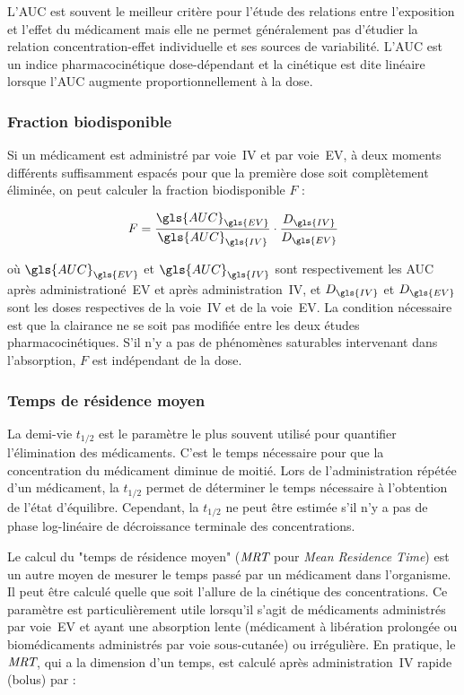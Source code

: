 L'\gls{AUC} est souvent le meilleur critère pour l'étude des relations entre l'exposition et l'effet du médicament mais elle ne permet généralement pas d'étudier la relation concentration-effet individuelle et ses sources de variabilité. L'\gls{AUC} est un indice pharmacocinétique dose-dépendant et la cinétique est dite linéaire lorsque l'\gls{AUC} augmente proportionnellement à la dose.

\subsubsection{Fraction biodisponible}
Si un médicament est administré par voie~\gls{IV} et par voie~\gls{EV}, à deux moments différents suffisamment espacés pour que la première dose soit complètement éliminée, on peut calculer la fraction biodisponible $F$ :

\begin{equation}
F = \frac{\gls{AUC}_{\gls{EV}}}{\gls{AUC}_{\gls{IV}}} \cdot \frac{D_{\gls{IV}}}{D_{\gls{EV}}}
\label{eq:5}
\end{equation}

où $\gls{AUC}_{\gls{EV}}$ et $\gls{AUC}_{\gls{IV}}$ sont respectivement les \gls{AUC} après administrationé~\gls{EV} et après administration~\gls{IV}, et $D_{\gls{IV}}$ et $D_{\gls{EV}}$ sont les doses respectives de la voie~\gls{IV} et de la voie~\gls{EV}. La condition nécessaire est que la clairance ne se soit pas modifiée entre les deux études pharmacocinétiques. S'il n'y a pas de phénomènes saturables intervenant dans l'absorption, $F$ est indépendant de la dose.

\subsubsection{Temps de résidence moyen} 
La demi-vie $t_{1/2}$ est le paramètre le plus souvent utilisé pour quantifier l'élimination des médicaments. C'est le temps nécessaire pour que la concentration du médicament diminue de moitié. Lors de l'administration répétée d'un médicament, la $t_{1/2}$ permet de déterminer le temps nécessaire à l'obtention de l'état d'équilibre. Cependant, la $t_{1/2}$ ne peut être estimée s'il n'y a pas de phase log-linéaire de décroissance terminale des concentrations.

Le calcul du "temps de résidence moyen" ($\operatorname{\textit{MRT}}$ pour \textit{Mean Residence Time}) est un autre moyen de mesurer le temps passé par un médicament dans l'organisme. Il peut être calculé quelle que soit l'allure de la cinétique des concentrations. Ce paramètre est particulièrement utile lorsqu'il s'agit de médicaments administrés par voie~\gls{EV} et ayant une absorption lente (médicament à libération prolongée ou biomédicaments administrés par voie sous-cutanée) ou irrégulière. En pratique, le $\operatorname{\textit{MRT}}$, qui a la dimension d'un temps, est calculé après administration~\gls{IV} rapide (bolus) par :

